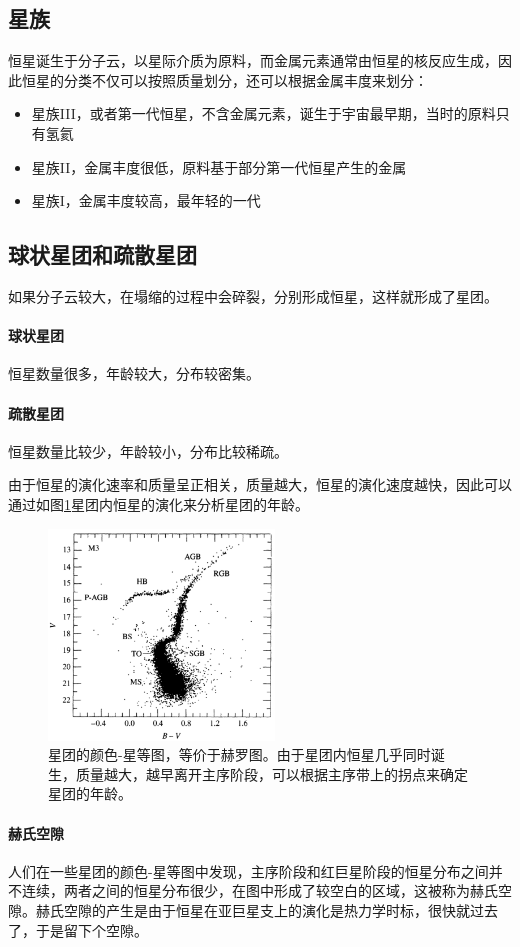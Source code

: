 \subsection{星族}
恒星诞生于分子云，以星际介质为原料，而金属元素通常由恒星的核反应生成，因此恒星的分类不仅可以按照质量划分，还可以根据金属丰度来划分：
\begin{itemize}
  \item 星族III，或者第一代恒星，不含金属元素，诞生于宇宙最早期，当时的原料只有氢氦
  \item 星族II，金属丰度很低，原料基于部分第一代恒星产生的金属
  \item 星族I，金属丰度较高，最年轻的一代
\end{itemize}

\subsection{球状星团和疏散星团}
如果分子云较大，在塌缩的过程中会碎裂，分别形成恒星，这样就形成了星团。
\paragraph{球状星团}
恒星数量很多，年龄较大，分布较密集。
\paragraph{疏散星团}
恒星数量比较少，年龄较小，分布比较稀疏。

由于恒星的演化速率和质量呈正相关，质量越大，恒星的演化速度越快，因此可以通过如图\ref{fig:cluster}星团内恒星的演化来分析星团的年龄。
\begin{figure}[hbt]
  \centering
  \includegraphics[width=6cm]{chapters/13/cluster}
  \caption{星团的颜色-星等图，等价于赫罗图。由于星团内恒星几乎同时诞生，质量越大，越早离开主序阶段，可以根据主序带上的拐点来确定星团的年龄。}
  \label{fig:cluster}
\end{figure}

\paragraph{赫氏空隙}
人们在一些星团的颜色-星等图中发现，主序阶段和红巨星阶段的恒星分布之间并不连续，两者之间的恒星分布很少，在图中形成了较空白的区域，这被称为赫氏空隙。赫氏空隙的产生是由于恒星在亚巨星支上的演化是热力学时标，很快就过去了，于是留下个空隙。

